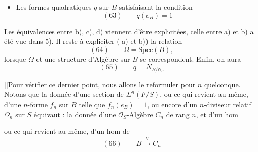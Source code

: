 \documentclass[11pt,a4paper]{article}
\begin{document}
\begin{itemize}
\item[d)] Les formes quadratiques $q$ sur $B$ satisfaisant la condition
\[
(63)\qquad q(e_B) = 1
\]
\end{itemize}

Les équivalences entre b), c), d) viennent d'être explicitées, celle entre a) et b) a été vue dans 5). Il reste à expliciter ( \ill{} a) et b)) la relation
\[
(64)\qquad \Omega = \mathrm{Spec}(B) ,
\]
lorsque $\Omega$  et une structure d'Algèbre sur $B$ se correspondent. Enfin, on aura
\[
(65)\qquad q = N_{B/\mathcal{O}_S}
\]

[[Pour vérifier ce dernier point, nous allons le reformuler pour $n$ quelconque. Notons que la donnée d'une section de $\Sigma^n(F/S)$, ou ce qui revient au même, d'une $n$-forme $f_n$ sur $B$ telle que $f_n(e_B) = 1$, ou encore d'un $n$-diviseur relatif $\Omega_n$ sur $S$ équivaut : la donnée d'une  $\mathcal{O}_S$-Algèbre $C_n$ de rang $n$, et d'un hom 


ou ce qui revient au même, d'un hom de 
\[
(66)\qquad B \xrightarrow{\;g\;} C_n
\]
\end{document}
